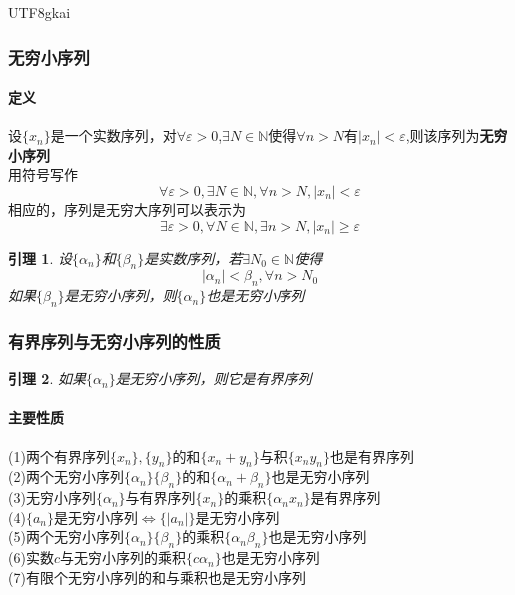 \documentclass{article}
\newtheorem{lemma}{引理}[subsection]
\begin{document}
\begin{CJK}{UTF8}{gkai}
\subsubsection{无穷小序列}
\paragraph{定义\\}
设$\{x_n\}$是一个实数序列，对$\forall \varepsilon > 0  $,$\exists N\in \mathbb{N}$使得$\forall n > N$有$|x_n|<\varepsilon$,则该序列为\textbf{无穷小序列}\\
用符号写作
\[\forall \varepsilon > 0 ,\exists N\in \mathbb{N},\forall n > N, |x_n|  <   \varepsilon \]
相应的，序列是无穷大序列可以表示为\\
\[\exists \varepsilon > 0 ,\forall N\in \mathbb{N},\exists n > N, |x_n| \geq \varepsilon \]
\begin{lemma}
设$\{\alpha_n\}$和$\{\beta_n\}$是实数序列，若$\exists N_0\in \mathbb{N}$使得
\[|\alpha_n| < \beta_n,\forall n > N_0\]
如果$\{\beta _n\}$是无穷小序列，则$\{\alpha _n\}$也是无穷小序列\\
\end{lemma}

\subsubsection{有界序列与无穷小序列的性质}

\begin{lemma}
如果$\{\alpha_n\}$是无穷小序列，则它是有界序列\\
\end{lemma}
\paragraph{主要性质\\}
(1)两个有界序列$\{x_n\},\{y_n\}$的和$\{x_n+y_n\}$与积$\{x_n y_n\}$也是有界序列\\
(2)两个无穷小序列$\{\alpha_n\}\{\beta_n\}$的和$\{\alpha_n+\beta_n\}$也是无穷小序列\\
(3)无穷小序列$\{\alpha_n\}$与有界序列$\{x_n\}$的乘积$\{\alpha_n x_n\}$是有界序列\\
(4)$\{a_n\}$是无穷小序列$\Leftrightarrow\{|a_n|\}$是无穷小序列\\
(5)两个无穷小序列$\{\alpha_n\}\{\beta_n\}$的乘积$\{\alpha_n\beta_n\}$也是无穷小序列\\
(6)实数$c$与无穷小序列的乘积$\{c\alpha_n\}$也是无穷小序列\\
(7)有限个无穷小序列的和与乘积也是无穷小序列\\



\end{CJK}
\end{document}
